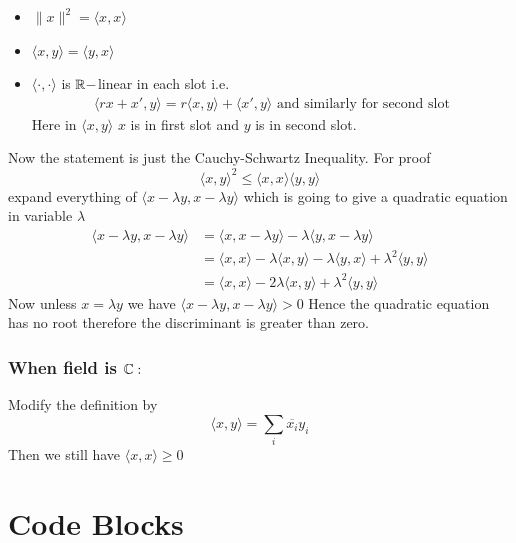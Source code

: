 \documentclass{report}
\begin{document}
{	\begin{note}
		\begin{itemize}
			\item $\|x\|^2=\langle x,x\rangle$
			\item $\langle x,y\rangle=\langle y,x\rangle$
			\item $\langle \cdot,\cdot\rangle$ is $\mathbb{R}-$linear in each slot i.e. \begin{align*}
				      \langle rx+x',y\rangle=r\langle x,y\rangle+\langle x',y\rangle	\text{ and similarly for second slot}
			      \end{align*}Here in $\langle x,y\rangle$ $x$ is in first slot and $y$ is in second slot.
		\end{itemize}
	\end{note}Now the statement is just the Cauchy-Schwartz Inequality. For proof $$\langle x,y\rangle^2\leq \langle x,x\rangle\langle y,y\rangle $$ expand everything of $\langle x-\lambda y,x-\lambda y\rangle$ which is going to give a quadratic equation in variable $\lambda $ \begin{align*}
		\langle x-\lambda y,x-\lambda y\rangle & =\langle x,x-\lambda y\rangle-\lambda\langle y,x-\lambda y\rangle                                       \\
		                                       & =\langle x ,x\rangle -\lambda\langle x,y\rangle -\lambda\langle y,x\rangle +\lambda^2\langle y,y\rangle \\
		                                       & =\langle x,x\rangle -2\lambda\langle x,y\rangle+\lambda^2\langle y,y\rangle
	\end{align*}Now unless $x=\lambda y$ we have $\langle x-\lambda y,x-\lambda y\rangle>0$ Hence the quadratic equation has no root therefore the discriminant is greater than zero.

	\subsubsection*{\textbf{When field is $\mathbb{C}:$}}Modify the definition by $$\langle x,y\rangle=\sum_i\overline{x_i}y_i$$Then we still have $\langle x,x\rangle\geq 0$}

\newpage
\section{Code Blocks}
\end{document}
